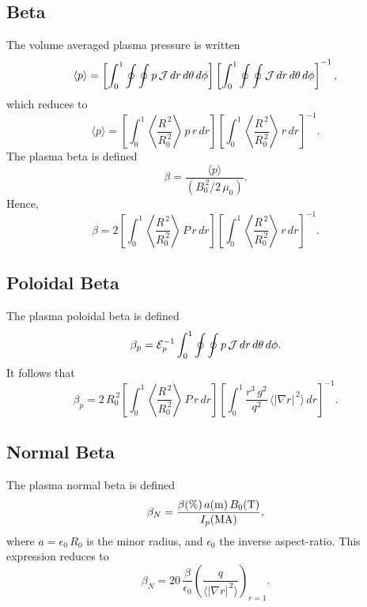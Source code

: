 \documentclass[12pt,prb,aps,notitlepage]{revtex4-1}
\begin{document}
\subsection{Beta}
The volume averaged plasma pressure is written
\begin{equation}
\langle p\rangle = \left[\int_0^1\oint\oint p\,{\cal J}\,dr\,d\theta\,d\phi\right]
\left[\int_0^1\oint\oint {\cal J}\,dr\,d\theta\,d\phi\right]^{-1},
\end{equation}
which reduces to
\begin{equation}
\langle p\rangle = \left[\int_0^1 \left\langle\frac{R^{\,2}}{R_0^{\,2}}\right\rangle\,p\,r\,dr\right]
\left[\int_0^1 \left\langle\frac{R^{\,2}}{R_0^{\,2}}\right\rangle\,r\,dr\right]^{-1}.
\end{equation}
The plasma beta is defined
\begin{equation}
\beta = \frac{\langle p\rangle}{(B_0^{\,2}/2\,\mu_0)}.
\end{equation}
Hence,
\begin{equation}
\beta  = 2\left[\int_0^1 \left\langle\frac{R^{\,2}}{R_0^{\,2}}\right\rangle\,P\,r\,dr\right]
\left[\int_0^1 \left\langle\frac{R^{\,2}}{R_0^{\,2}}\right\rangle\,r\,dr\right]^{-1}.
\end{equation}

\subsection{Poloidal Beta}
The plasma poloidal beta is defined
\begin{equation}
\beta_p = {\cal E}_p^{-1}\int_0^1\oint\oint p\,{\cal J}\,dr\,d\theta\,d\phi.
\end{equation}
It follows that
\begin{equation}
\beta_p= 2\,R_0^{\,2}\left[\int_0^1\left\langle\frac{R^{\,2}}{R_0^{\,2}}\right\rangle \, P\,r\,dr\right]
\left[\int_0^1 \frac{r^3\,g^2}{q^2}\,\langle |\nabla r|^{\,2}\rangle\,dr\right]^{-1}.
\end{equation}

\subsection{Normal Beta}
The plasma normal beta is defined
\begin{equation}
\beta_N = \frac{\beta(\%)\,a({\rm m})\,B_0({\rm T})}{I_p({\rm MA})},
\end{equation}
where $a=\epsilon_0\,R_0$ is the minor radius, and $\epsilon_0$ the inverse aspect-ratio. This expression reduces to
\begin{equation}
\beta_N = 20\,\frac{\beta}{\epsilon_0}\left(\frac{q}{\langle |\nabla r|^{\,2}\rangle}\right)_{r=1}.
\end{equation}
\end{document}
